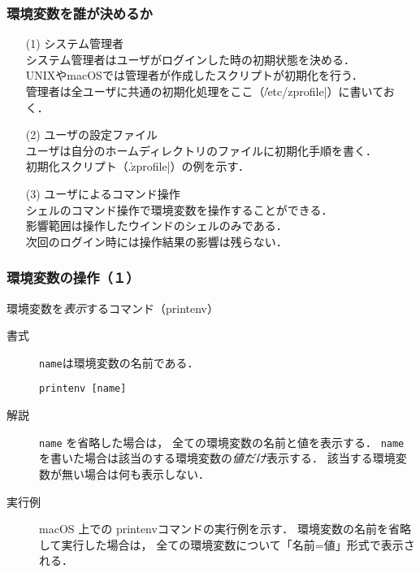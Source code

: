 \documentclass{beamer}                 %
\begin{document}
\begin{frame}[fragile]
  \frametitle{環境変数を誰が決めるか}
  \begin{enumerate}
  \item[(1)] システム管理者\\
    システム管理者はユーザがログインした時の初期状態を決める．\\
    UNIXやmacOSでは管理者が作成したスクリプトが初期化を行う．\\
    管理者は全ユーザに共通の初期化処理をここ（\|/etc/zprofile|）に書いておく．
  \item[(2)] ユーザの設定ファイル \\
    ユーザは自分のホームディレクトリのファイルに初期化手順を書く．\\
    初期化スクリプト（\|.zprofile|）の例を示す．
  \item[(3)] ユーザによるコマンド操作 \\
    シェルのコマンド操作で環境変数を操作することができる．\\
    影響範囲は操作したウインドのシェルのみである．\\
    次回のログイン時には操作結果の影響は残らない．\\
  \end{enumerate}
\end{frame}

\begin{frame}[fragile]
  \frametitle{環境変数の操作（１）}
  環境変数を\emph{表示}するコマンド（printenv）
\begin{description}
\item[書式] \texttt{name}は環境変数の名前である．
\begin{lstlisting}[numbers=none]
  printenv [name]
\end{lstlisting}
\item[解説]
  \texttt{name} を省略した場合は，
  全ての環境変数の名前と値を表示する．
  \texttt{name} を書いた場合は該当のする環境変数の\emph{値だけ}表示する．
  該当する環境変数が無い場合は何も表示しない．
\item [実行例]  macOS 上での printenvコマンドの実行例を示す．
  環境変数の名前を省略して実行した場合は，
  全ての環境変数について「名前=値」形式で表示される．
\end{description}
\end{frame}
\end{document}
